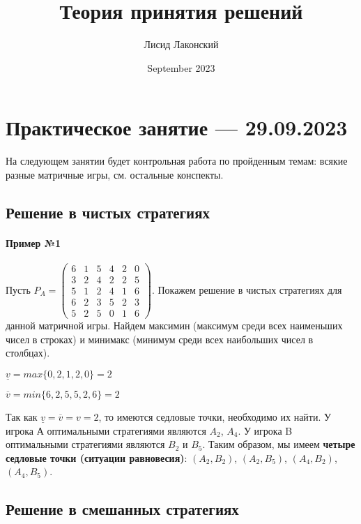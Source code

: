 \documentclass{article}
\title{Теория принятия решений}
\author{Лисид Лаконский}
\date{September 2023}
\begin{document}
\raggedright

\maketitle

\tableofcontents
\pagebreak

\section{Практическое занятие — 29.09.2023}

На следующем занятии будет контрольная работа по пройденным темам: всякие разные матричные игры, см. остальные конспекты.

\subsection{Решение в чистых стратегиях}

\paragraph{Пример №1} Пусть $P_{A} = \begin{pmatrix}
    6 & 1 & 5 & 4 & 2 & 0 \\
    3 & 2 & 4 & 2 & 2 & 5 \\
    5 & 1 & 2 & 4 & 1 & 6 \\
    6 & 2 & 3 & 5 & 2 & 3 \\
    5 & 2 & 5 & 0 & 1 & 6
\end{pmatrix}$. Покажем решение в чистых стратегиях для данной матричной игры. Найдем максимин (максимум среди всех наименьших чисел в строках) и минимакс (минимум среди всех наибольших чисел в столбцах).

$\underline{v} = max \{ 0, 2, 1, 2, 0 \} = 2$

$\overline{v} = min \{ 6, 2, 5, 5, 2, 6 \} = 2$

Так как $\underline{v} = \overline{v} = v = 2$, то имеются седловые точки, необходимо их найти. У игрока А оптимальными стратегиями являются $A_{2}$, $A_{4}$. У игрока B оптимальными стратегиями являются $B_{2}$ и $B_{5}$. Таким образом, мы имеем \textbf{четыре седловые точки (ситуации равновесия)}: $(A_{2}, B_{2})$, $(A_{2}, B_{5})$, $(A_{4}, B_{2})$, $(A_{4}, B_{5})$.

\subsection{Решение в смешанных стратегиях}
\end{document}
